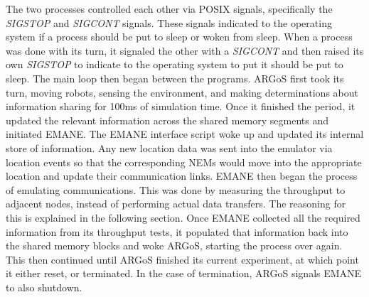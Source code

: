 The two processes controlled each other via POSIX signals, specifically the \textit{SIGSTOP} and \textit{SIGCONT} signals.
These signals indicated to the operating system if a process should be put to sleep or woken from sleep.
When a process was done with its turn, it signaled the other with a \textit{SIGCONT} and then raised its own \textit{SIGSTOP} to indicate to the operating system to put it should be put to sleep.
The main loop then began between the programs.
ARGoS first took its turn, moving robots, sensing the environment, and making determinations about information sharing for 100ms of simulation time.
Once it finished the period, it updated the relevant information across the shared memory segments and initiated EMANE.
The EMANE interface script woke up and updated its internal store of information.
Any new location data was sent into the emulator via location events so that the corresponding NEMs would move into the appropriate location and update their communication links.
EMANE then began the process of emulating communications.
This was done by measuring the throughput to adjacent nodes, instead of performing actual data transfers. The reasoning for this is explained in the following section.
Once EMANE collected all the required information from its throughput tests, it populated that information back into the shared memory blocks and woke ARGoS, starting the process over again.
This then continued until ARGoS finished its current experiment, at which point it either reset, or terminated.
In the case of termination, ARGoS signals EMANE to also shutdown.
